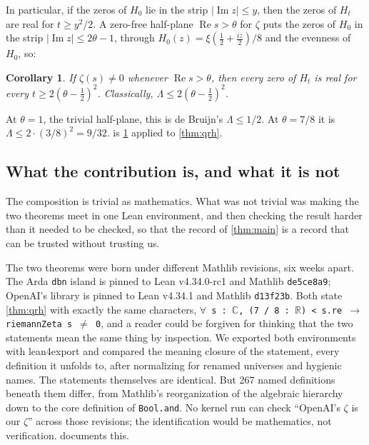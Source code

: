 \documentclass[11pt]{article}
\newtheorem{corollary}[theorem]{Corollary}
\theoremstyle{definition}
\newcommand{\lean}[1]{\texttt{#1}}
\newcommand{\Lam}{\Lambda}
\newcommand{\Hfun}{H}
\newcommand{\re}{\operatorname{Re}}
\newcommand{\im}{\operatorname{Im}}
\newcommand{\C}{\mathbb{C}}
\newcommand{\R}{\mathbb{R}}
\begin{document}
In particular, if the zeros of $\Hfun_0$ lie in the strip $|\im z| \le y$, then the zeros of $\Hfun_t$ are real for $t \ge y^2/2$. A zero-free half-plane $\re s > \theta$ for $\zeta$ puts the zeros of $\Hfun_0$ in the strip $|\im z| \le 2\theta - 1$, through $\Hfun_0(z) = \xi(\tfrac12 + \tfrac{iz}{2})/8$ and the evenness of $\Hfun_0$, so:

\begin{corollary}\label{cor:conv}
If $\zeta(s) \ne 0$ whenever $\re s > \theta$, then every zero of $\Hfun_t$ is real for every $t \ge 2(\theta - \tfrac12)^2$. Classically, $\Lam \le 2(\theta - \tfrac12)^2$.
\end{corollary}

At $\theta = 1$, the trivial half-plane, this is de Bruijn's $\Lam \le 1/2$. At $\theta = 7/8$ it is $\Lam \le 2 \cdot (3/8)^2 = 9/32$.  is \cref{cor:conv} applied to \cref{thm:qrh}.

\subsection{What the contribution is, and what it is not}

The composition is trivial as mathematics. What was not trivial was making the two theorems meet in one Lean environment, and then checking the result harder than it needed to be checked, so that the record of \cref{thm:main} is a record that can be trusted without trusting us.

The two theorems were born under different Mathlib revisions, six weeks apart. The Arda \lean{dbn} island is pinned to Lean v4.34.0-rc1 and Mathlib \lean{de5ce8a9}; OpenAI's library is pinned to Lean v4.34.1 and Mathlib \lean{d13f23b}. Both state \cref{thm:qrh} with exactly the same characters, \lean{$\forall$ s : $\C$, (7 / 8 : $\R$) < s.re $\to$ riemannZeta s $\neq$ 0}, and a reader could be forgiven for thinking that the two statements mean the same thing by inspection. We exported both environments with lean4export and compared the meaning closure of the statement, every definition it unfolds to, after normalizing for renamed universes and hygienic names. The statements themselves are identical. But 267 named definitions beneath them differ, from Mathlib's reorganization of the algebraic hierarchy down to the core definition of \lean{Bool.and}. No kernel run can check ``OpenAI's $\zeta$ is our $\zeta$'' across those revisions; the identification would be mathematics, not verification.  documents this.
\end{document}
